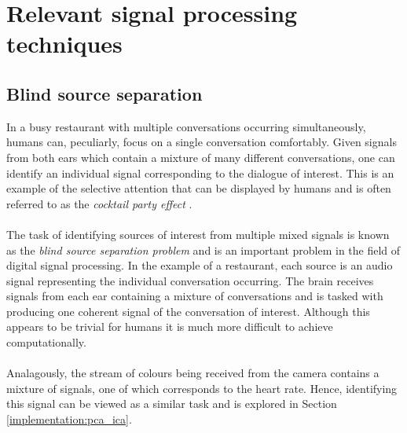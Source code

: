 \section{Relevant signal processing techniques}
\subsection{Blind source separation}
\label{ref:bss_prep}
In a busy restaurant with multiple conversations occurring simultaneously, humans can, peculiarly, focus on a single conversation comfortably.
Given signals from both ears which contain a mixture of many different conversations, one can identify an individual signal corresponding to the dialogue of interest.
This is an example of the selective attention that can be displayed by humans and is often referred to as the \textit{cocktail party effect} \cite{Cherry}.
\\\\
The task of identifying sources of interest from multiple mixed signals is known as the \textit{blind source separation problem} and is an important problem in the field of digital signal processing. 
In the example of a restaurant, each source is an audio signal representing the individual conversation occurring. The brain receives signals 
from each ear containing a mixture of conversations and is tasked with producing one coherent signal of the conversation of interest.
Although this appears
to be trivial for humans it is much more difficult to achieve computationally.
\\\\
Analagously, the stream of colours being received from the camera contains a mixture of signals, one of which corresponds to the heart rate. Hence, identifying this signal can be viewed as a similar task and is explored in Section \ref{implementation:pca_ica}.




